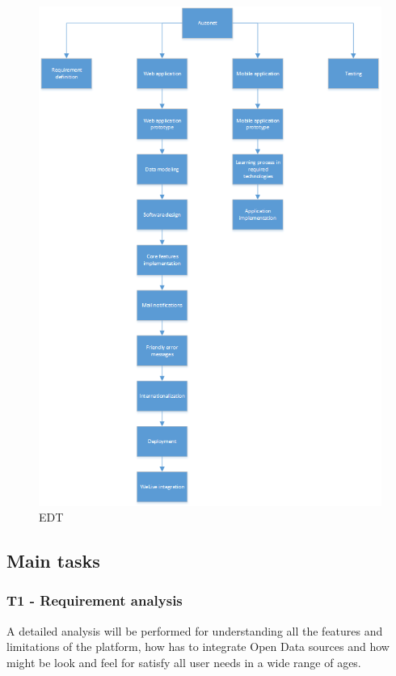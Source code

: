 \documentclass{DeustoFDP}
\begin{document}
\begin{figure}[H]
	\centering
	\includegraphics{fig/EDT}
	\caption{EDT}\label{fig:edt}
\end{figure}
\subsection{Main tasks}
\subsubsection{T1 - Requirement analysis}
A detailed analysis will be performed for understanding all the features and limitations of the platform, how has to integrate Open Data sources and how might be look and feel for satisfy all user needs in a wide range of ages.
\end{document}
